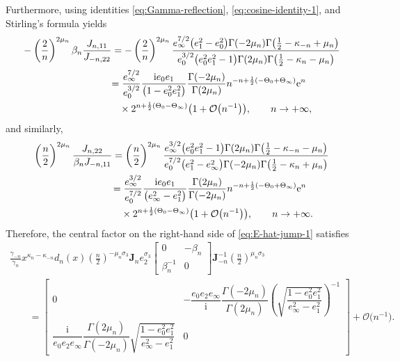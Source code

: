 \documentclass[pdftex]{sigma}
\numberwithin{equation}{section}
\newcommand{\ee}{\mathrm{e}}
\newcommand{\ii}{\mathrm{i}}
\begin{document}
Furthermore, using identities \eqref{eq:Gamma-reflection}, \eqref{eq:cosine-identity-1}, and Stirling's formula yields
\begin{align*}
 & -\left(\frac{2}{n}\right)^{2\mu_n}\beta_n\frac{J_{n,11}}{J_{-n,22}} = -\left(\frac{2}{n}\right)^{2\mu_n} \frac{e_\infty^{7/2} \big(e_1^2-e_0^2\big) \Gamma (-2 \mu_n ) \Gamma \big(\frac{1}{2}-\kappa_{-n}+\mu_n \big)}{e_0^{3/2} \big(e_0^2 e_1^2-1\big) \Gamma (2 \mu_n ) \Gamma \big(\frac{1}{2}-\kappa_{n}-\mu_n \big)} \\
 &\hphantom{-\left(\frac{2}{n}\right)^{2\mu_n}\beta_n\frac{J_{n,11}}{J_{-n,22}}}{}
 = \frac{e_\infty^{7/2}}{e_0^{3/2}} \dfrac{\ii e_0e_1}{\big(1- e_0^2 e_1^2\big) } \dfrac{\Gamma (-2 \mu_n ) }{ \Gamma (2 \mu_n ) } n^{-n+\frac{1}{2}(-\Theta_0+\Theta_\infty)}\ee^n \\
 &\hphantom{-\left(\frac{2}{n}\right)^{2\mu_n}\beta_n\frac{J_{n,11}}{J_{-n,22}}=}{}
 \times 2^{n + \frac{1}{2}(\Theta_0-\Theta_\infty)}\big(1+\mathcal{O}\big(n^{-1}\big)\big),\qquad n\to+\infty,
\end{align*}
and similarly,
\begin{align*}
&\left(\frac{n}{2}\right)^{2\mu_n}\frac{J_{n,22}}{\beta_nJ_{-n,11}} = \left(\frac{n}{2}\right)^{2\mu_n} \frac{e_\infty^{3/2}\big(e_0^2 e_1^2-1\big) \Gamma (2 \mu_n ) \Gamma \big(\frac{1}{2}-\kappa_{-n}-\mu_n \big)}{e_0^{7/2} \big(e_1^2-e_\infty^2\big) \Gamma (-2 \mu_n ) \Gamma \big(\frac{1}{2}-\kappa_n+\mu_n \big)}\\
&\hphantom{\left(\frac{n}{2}\right)^{2\mu_n}\frac{J_{n,22}}{\beta_nJ_{-n,11}}}{}
= \frac{e_\infty^{3/2}}{e_0^{7/2}} \dfrac{\ii e_0e_1}{\big(e_\infty^2 - e_1^2\big)}\dfrac{ \Gamma (2 \mu_n ) }{ \Gamma (-2 \mu_n )}n^{-n+\frac{1}{2}(-\Theta_0+\Theta_\infty)}\ee^n \\
&\hphantom{\left(\frac{n}{2}\right)^{2\mu_n}\frac{J_{n,22}}{\beta_nJ_{-n,11}}=}{}
\times 2^{n + \frac{1}{2}(\Theta_0-\Theta_\infty)}\big(1+\mathcal{O}\big(n^{-1}\big)\big),\qquad n\to+\infty.
\end{align*}
Therefore, the central factor on the right-hand side of \eqref{eq:E-hat-jump-1} satisfies
\begin{gather*}
\frac{\gamma_{-n}}{\gamma_n}x^{\kappa_n-\kappa_{-n}}d_n(x)\left(\frac{n}{2}\right)^{-\mu_n\sigma_3}\mathbf{J}_ne_2^{\sigma_3}\begin{bmatrix}0 & -\beta_n\\\beta_n^{-1} & 0\end{bmatrix}\mathbf{J}_{-n}^{-1}\left(\frac{n}{2}\right)^{\mu_n\sigma_3}\\
\qquad = \begin{bmatrix} 0 & -\dfrac{e_0 e_2 e_\infty}{\ii}\dfrac{ \Gamma (-2 \mu_n )}{ \Gamma (2 \mu_n )} \left(\sqrt{\dfrac{1 - e_0^2 e_1^2}{e_\infty^2-e_1^2 } }\right)^{-1} \\
 \dfrac{ \ii }{e_0 e_2 e_\infty} \dfrac{\Gamma (2 \mu_n )}{ \Gamma (-2 \mu_n )} \sqrt{\dfrac{1 - e_0^2 e_1^2}{e_\infty^2-e_1^2 }} & 0
\end{bmatrix} + \mathcal{O}\big(n^{-1}\big).
\end{gather*}
\end{document}
